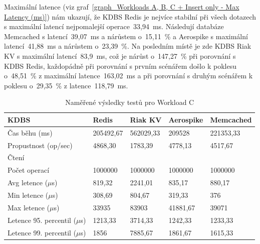 \documentclass[czech,master,dept460,male,csharp,cpdeclaration]{diploma}
\begin{document}
	Maximální latence (viz graf~\ref{graph_Workloads A, B, C + Insert only - Max Latency (ms)}) nám ukazují, že KDBS Redis je nejvíce stabilní při všech dotazech s maximální latencí nejpomalejší operace~33,94~ms. Následují databáze Memcached s latencí~39,07~ms a nárůstem o~15,11~\% a Aerospike s maximální latencí~41,88~ms a nárůstem o~23,39~\%. Na posledním místě je zde KDBS Riak KV s maximální latencí~83,9~ms, což je nárůst o~147,27~\% při porovnání s KDBS Redis, každopádně při porovnání s prvním scénářem došlo k poklesu o~48,51~\% z maximální latence~163,02~ms a při porovnání s druhým scénářem k poklesu o~29,35~\% z latence~118,79~ms.
	
	\begin{table}
		\centering
		\begin{tabular}{ l | l l l l }
			\toprule
			KDBS & Redis & Riak KV & Aerospike & Memcached \\
			\midrule
			Čas běhu (ms) & 205492,67 & 562029,33 & 209528 & 221353,33 \\
			Propustnost (op/sec) & 4868,30 & 1783,39 & 4778,13 & 4517,67 \\
			\midrule
			\multicolumn{5}{l}{Čtení} \\
			Počet operací & 1000000 & 1000000 & 1000000 & 1000000 \\
			Avg letence ($\mu$s) & 819,32 & 2241,01 & 835,17 & 880,17 \\
			Min letence ($\mu$s) & 308,69 & 804,67 & 319,33 & 376 \\
			Max letence ($\mu$s) & 33935 & 83903 & 41881,67 & 39071 \\
			Letence 95. percentil ($\mu$s) & 1213,33 & 3714,33 & 1242,33 & 1233,33 \\
			Letence 99. percentil ($\mu$s) & 1856 & 7885,67 & 1861,67 & 1615,33 \\
			\bottomrule
		\end{tabular}
		\caption{Naměřené výsledky testů pro Workload C\label{tab_workload_c}}
	\end{table}
	
\end{document}
